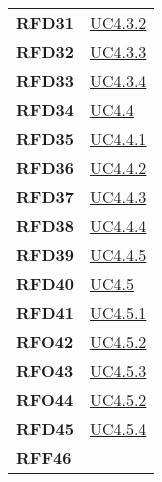 \begin{longtable}[H]{>{\centering\bfseries}m{8cm} >{\centering\arraybackslash}m{8cm}}
    RFD31
    &  \hyperref[ssub:uc4.3.2]{UC4.3.2} \\

    RFD32

    &  \hyperref[ssub:uc4.3.3]{UC4.3.3} \\

    RFD33

    &  \hyperref[ssub:uc4.3.2]{UC4.3.4} \\

    RFD34

    &  \hyperref[ssub:uc4.4]{UC4.4} \\

    RFD35

    &  \hyperref[ssub:uc4.4.1]{UC4.4.1} \\

    RFD36

    &  \hyperref[ssub:uc4.4.2]{UC4.4.2} \\

    RFD37

    &  \hyperref[ssub:uc4.4.3]{UC4.4.3} \\

    RFD38

    &  \hyperref[ssub:uc4.4.4]{UC4.4.4} \\

    RFD39

    &  \hyperref[ssub:uc4.4.5]{UC4.4.5} \\

    RFD40
    
    &  \hyperref[ssub:uc4.5]{UC4.5} \\

    RFD41
  
    &  \hyperref[ssub:uc4.5.1]{UC4.5.1} \\

    RFO42
  
    &  \hyperref[ssub:uc4.5.2]{UC4.5.2} \\

    RFO43
  
    &  \hyperref[ssub:uc4.5.3]{UC4.5.3} \\

    RFO44
    
    &  \hyperref[ssub:uc4.5.2]{UC4.5.2} \\

    RFD45

    &  \hyperref[ssub:uc4.5.4]{UC4.5.4} \\

    RFF46
  

\end{longtable}

